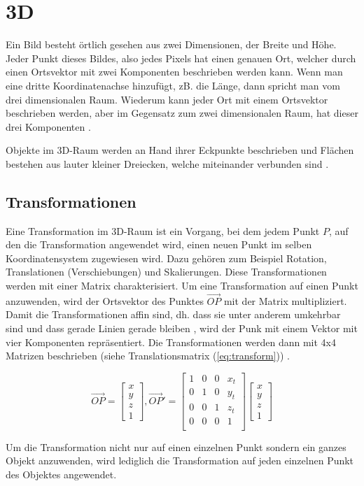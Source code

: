 \section{3D}

Ein Bild besteht örtlich gesehen aus zwei Dimensionen, der Breite und Höhe. Jeder Punkt dieses Bildes, also jedes Pixels hat einen genauen Ort, welcher durch einen Ortsvektor mit zwei Komponenten beschrieben werden kann. Wenn man eine dritte Koordinatenachse hinzufügt, zB. die Länge, dann spricht man vom drei dimensionalen Raum. Wiederum kann jeder Ort mit einem Ortsvektor beschrieben werden, aber im Gegensatz zum zwei dimensionalen Raum, hat dieser drei Komponenten \cite{computergraphics:1}.

Objekte im 3D-Raum werden an Hand ihrer Eckpunkte beschrieben und Flächen bestehen aus lauter kleiner Dreiecken, welche miteinander verbunden sind \cite{computergraphics:1}.

\subsection{Transformationen}

Eine Transformation im 3D-Raum ist ein Vorgang, bei dem jedem Punkt $P$, auf den die Transformation angewendet wird, einen neuen Punkt im selben Koordinatensystem zugewiesen wird. Dazu gehören zum Beispiel Rotation, Translationen (Verschiebungen) und Skalierungen. Diese Transformationen werden mit einer Matrix charakterisiert. Um eine Transformation auf einen Punkt anzuwenden, wird der Ortsvektor des Punktes $\vec{OP}$ mit der Matrix multipliziert. Damit die Transformationen affin sind, dh. dass sie unter anderem umkehrbar sind und dass gerade Linien gerade bleiben \cite{affinetransformation:1}, wird der Punk mit einem Vektor mit vier Komponenten repräsentiert. Die Transformationen werden dann mit 4x4 Matrizen beschrieben (siehe  Translationsmatrix (\ref{eq:transform})) \cite{computergraphics:1}.

\begin{equation}
	\vec{OP} =
	\begin{bmatrix}
  	x \\
	y\\
	z\\
	1
	\end{bmatrix}
	, \vec{OP}' =
	\begin{bmatrix}
  	1 & 0 & 0 & x_t\\
	0 & 1 & 0 & y_t\\
	0 & 0 & 1 & z_t\\
	0 & 0 & 0 & 1\\
	\end{bmatrix}
	\begin{bmatrix}
  	x \\
	y\\
	z\\
	1
	\end{bmatrix}
	\label{eq:transform}
\end{equation}
\cite{computergraphics:1}

Um die Transformation nicht nur auf einen einzelnen Punkt sondern ein ganzes Objekt anzuwenden, wird lediglich die Transformation auf jeden einzelnen Punkt des Objektes angewendet.